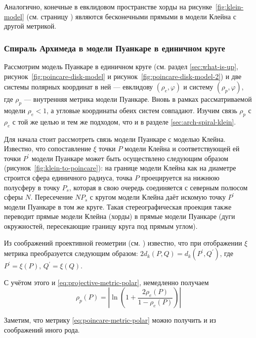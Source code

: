 \documentclass{article}
\numberwithin{equation}{section}
\renewcommand{\phi}{\varphi}
\providecommand{\abs}[1]{\left \lvert{#1}\right \rvert}
\begin{document}
Аналогично, конечные в евклидовом пространстве хорды на
рисунке \ref{fig:klein-model} (см. страницу \pageref{fig:klein-model})
являются бесконечными прямыми в модели Клейна с другой метрикой.

\subsubsection{Спираль Архимеда в модели Пуанкаре в единичном круге}

Рассмотрим модель Пуанкаре в единичном круге (см. раздел
\ref{sec:what-is-up}, рисунок \ref{fig:poincare-disk-model} и
рисунок \ref{fig:poincare-disk-model-2}) и две системы полярных
координат в ней — евклидову $(\rho_e, \phi)$ и систему $(\rho_p,
\phi)$, где $\rho_p$ — внутренняя метрика модели Пуанкаре. Вновь в
рамках рассматриваемой модели $\rho_e<1$, а угловые координаты обеих
систем совпадают. Изучим связь $\rho_p$ с $\rho_e$ с той же целью и
тем же подходом, что и в разделе \ref{sec:arch-spiral-klein}.



Для начала стоит рассмотреть связь модели Пуанкаре с моделью Клейна.
Известно, что сопоставление $\xi$ точки $P$ модели Клейна и
соответствующей ей точки $P^\prime$ модели Пуанкаре может быть
осуществлено следующим образом (рисунок \ref{fig:klein-to-poincare}):
на границе модели Клейна как на диаметре строится сфера единичного
радиуса, точка $P$ проецируется на нижнюю полусферу в точку $P_s$,
которая в свою очередь соединяется с северным полюсом сферы $N$.
Пересечение $NP_s$ с кругом модели Клейна даёт искомую точку
$P^\prime$ модели Пуанкаре в том же круге. Такая стереографическая
проекция также переводит прямые модели Клейна (хорды) в прямые модели
Пуанкаре (дуги окружностей, пересекающие границу круга под прямым
углом).



Из соображений проективной геометрии (см. \cite{prasolov04}) известно,
что при отображении $\xi$ метрика преобразуется следующим образом:
$2d_k(P,Q) = d_k(P^\prime, Q^\prime)$, где $P^\prime=\xi(P),\,Q^\prime=\xi(Q)$.

С учётом этого и \eqref{eq:projective-metric-polar}, немедленно получаем
\begin{equation}\label{eq:poincare-metric-polar}
 \rho_p(P) = \abs{\ln\left(1+\frac{2\rho_e(P)}{1-\rho_e(P)}\right)}  
\end{equation}

Заметим, что метрику \eqref{eq:poincare-metric-polar} можно
получить и из соображений иного рода.
\end{document}
